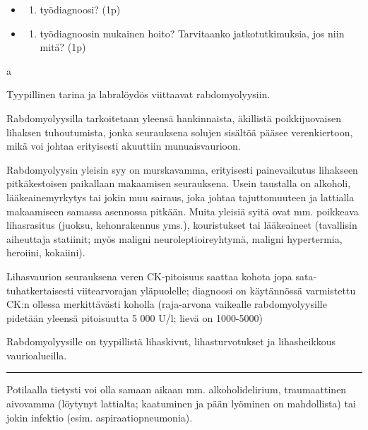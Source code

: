 \documentclass[
]{book}
\providecommand{\tightlist}{%
  \setlength{\itemsep}{0pt}\setlength{\parskip}{0pt}}
\begin{document}
\begin{itemize}
\tightlist
\item
  \begin{enumerate}
  \def\labelenumi{\alph{enumi}.}
  \tightlist
  \item
    työdiagnoosi? (1p)
  \end{enumerate}
\item
  \begin{enumerate}
  \def\labelenumi{\alph{enumi}.}
  \setcounter{enumi}{1}
  \tightlist
  \item
    työdiagnoosin mukainen hoito? Tarvitaanko jatkotutkimuksia, jos niin mitä? (1p)
  \end{enumerate}
\end{itemize}

a

Tyypillinen tarina ja labralöydös viittaavat rabdomyolyysiin.

Rabdomyolyysilla tarkoitetaan yleensä hankinnaista, äkillistä poikkijuovaisen lihaksen tuhoutumista, jonka seurauksena solujen sisältöä pääsee verenkiertoon, mikä voi johtaa erityisesti akuuttiin munuaisvaurioon.

Rabdomyolyysin yleisin syy on murskavamma, erityisesti painevaikutus lihakseen pitkäkestoisen paikallaan makaamisen seurauksena. Usein taustalla on alkoholi, lääkeainemyrkytys tai jokin muu sairaus, joka johtaa tajuttomuuteen ja lattialla makaamiseen samassa asennossa pitkään. Muita yleisiä syitä ovat mm. poikkeava lihasrasitus (juoksu, kehonrakennus yms.), kouristukset tai lääkeaineet (tavallisin aiheuttaja statiinit; myös maligni neuroleptioireyhtymä, maligni hypertermia, heroiini, kokaiini).

Lihasvaurion seurauksena veren CK-pitoisuus saattaa kohota jopa sata-tuhatkertaisesti viitearvorajan yläpuolelle; diagnoosi on käytännössä varmistettu CK:n ollessa merkittävästi koholla (raja-arvona vaikealle rabdomyolyysille pidetään yleensä pitoisuutta 5 000 U/l; lievä on 1000-5000)

Rabdomyolyysille on tyypillistä lihaskivut, lihasturvotukset ja lihasheikkous vaurioalueilla.

\begin{center}\rule{0.5\linewidth}{0.5pt}\end{center}

Potilaalla tietysti voi olla samaan aikaan mm. alkoholidelirium, traumaattinen aivovamma (löytynyt lattialta; kaatuminen ja pään lyöminen on mahdollista) tai jokin infektio (esim. aspiraatiopneumonia).
\end{document}
